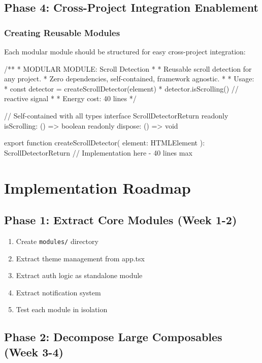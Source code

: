 \documentclass[11pt]{article}
\begin{document}
\subsection{Phase 4: Cross-Project Integration Enablement}

\subsubsection{Creating Reusable Modules}

Each modular module should be structured for easy cross-project integration:

\begin{typescriptcode}
/**
 * MODULAR MODULE: Scroll Detection
 * 
 * Reusable scroll detection for any project.
 * Zero dependencies, self-contained, framework agnostic.
 * 
 * Usage:
 *   const detector = createScrollDetector(element)
 *   detector.isScrolling() // reactive signal
 * 
 * Energy cost: 40 lines
 */

// Self-contained with all types
interface ScrollDetectorReturn {
  readonly isScrolling: () => boolean
  readonly dispose: () => void
}

export function createScrollDetector(
  element: HTMLElement
): ScrollDetectorReturn {
  // Implementation here - 40 lines max
}
\end{typescriptcode}

\section{Implementation Roadmap}

\subsection{Phase 1: Extract Core Modules (Week 1-2)}

\begin{enumerate}
\item Create \texttt{modules/} directory
\item Extract theme management from app.tsx
\item Extract auth logic as standalone module
\item Extract notification system
\item Test each module in isolation
\end{enumerate}

\subsection{Phase 2: Decompose Large Composables (Week 3-4)}
\end{document}
